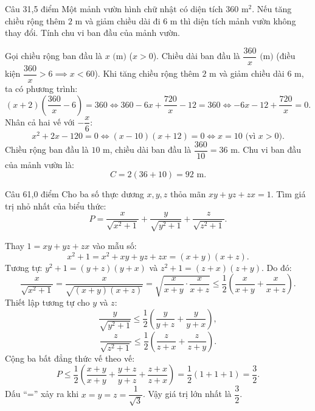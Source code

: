 \begin{de_cau}{Câu 3}{1,5 điểm}
Một mảnh vườn hình chữ nhật có diện tích $360\text{ m}^2$. Nếu tăng chiều rộng thêm $2\text{ m}$ và giảm chiều dài đi $6\text{ m}$ thì diện tích mảnh vườn không thay đổi. Tính chu vi ban đầu của mảnh vườn.
\end{de_cau}

\begin{loi_giai_cau}
Gọi chiều rộng ban đầu là $x\text{ (m)}$ ($x > 0$).
Chiều dài ban đầu là $\dfrac{360}{x}\text{ (m)}$ (điều kiện $\dfrac{360}{x} > 6 \implies x < 60$).
Khi tăng chiều rộng thêm $2\text{ m}$ và giảm chiều dài $6\text{ m}$, ta có phương trình:
\[(x + 2)\left(\frac{360}{x} - 6\right) = 360 \iff 360 - 6x + \frac{720}{x} - 12 = 360 \iff -6x - 12 + \frac{720}{x} = 0.\]
Nhân cả hai vế với $-\dfrac{x}{6}$:
\[x^2 + 2x - 120 = 0 \iff (x-10)(x+12) = 0 \iff x = 10\text{ (vì } x > 0).\]
Chiều rộng ban đầu là $10\text{ m}$, chiều dài ban đầu là $\dfrac{360}{10} = 36\text{ m}$.
Chu vi ban đầu của mảnh vườn là:
\[C = 2(36 + 10) = \boxed{92\text{ m}}.\]
\end{loi_giai_cau}

\begin{de_cau}{Câu 6}{1,0 điểm}
Cho ba số thực dương $x, y, z$ thỏa mãn $xy + yz + zx = 1$. Tìm giá trị nhỏ nhất của biểu thức:
\[P = \dfrac{x}{\sqrt{x^2+1}} + \dfrac{y}{\sqrt{y^2+1}} + \dfrac{z}{\sqrt{z^2+1}}.\]
\end{de_cau}

\begin{loi_giai_cau}
Thay $1 = xy+yz+zx$ vào mẫu số:
\[x^2 + 1 = x^2 + xy + yz + zx = (x+y)(x+z).\]
Tương tự: $y^2 + 1 = (y+z)(y+x)$ và $z^2 + 1 = (z+x)(z+y)$.
Do đó:
\[\frac{x}{\sqrt{x^2+1}} = \frac{x}{\sqrt{(x+y)(x+z)}} = \sqrt{\frac{x}{x+y} \cdot \frac{x}{x+z}} \le \frac{1}{2}\left(\frac{x}{x+y} + \frac{x}{x+z}\right).\]
Thiết lập tương tự cho $y$ và $z$:
\[\frac{y}{\sqrt{y^2+1}} \le \frac{1}{2}\left(\frac{y}{y+z} + \frac{y}{y+x}\right),\]
\[\frac{z}{\sqrt{z^2+1}} \le \frac{1}{2}\left(\frac{z}{z+x} + \frac{z}{z+y}\right).\]
Cộng ba bất đẳng thức vế theo vế:
\[P \le \frac{1}{2}\left(\frac{x+y}{x+y} + \frac{y+z}{y+z} + \frac{z+x}{z+x}\right) = \frac{1}{2}(1 + 1 + 1) = \frac{3}{2}.\]
Dấu ``='' xảy ra khi $x = y = z = \dfrac{1}{\sqrt{3}}$.
Vậy giá trị lớn nhất là $\dfrac{3}{2}$.
\end{loi_giai_cau}
